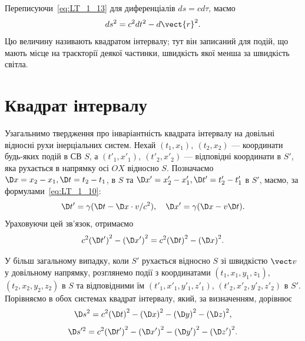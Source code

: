Переписуючи~\eqref{eq:LT_1_13} для диференціалів $ds=cd\tau $, маємо
\begin{equation*}
    ds^2=c^2dt^2-d\vect{r}^2.
\end{equation*}
Цю величину називають квадратом інтервалу; тут він записаний для подій, що мають місце на траєкторії деякої частинки,
швидкість якої менша за швидкість світла.

\section{Квадрат інтервалу}

Узагальнимо твердження про інваріантність квадрата інтервалу на довільні відносні рухи інерціальних систем. Нехай
$(t_1,x_1),\ (t_2,x_2)$ --- координати будь-яких подій в СВ $S$, а $(t'_1,x'_1),\ (t'_2,x'_2)$ --- відповідні координати
в $S'$, яка рухається в напрямку осі $OX$ відносно $S$. Позначаємо $\D x=x_2-x_1,\D t=t_2-t_1$, в $S$ та
$\D x'=x'_2-x'_1,\D t'=t'_2-t'_1$ в $S'$, маємо, за формулами~\eqref{eq:LT_1_10}:
\begin{equation*}
    \D t'=\gamma (\D t-\D x\cdot v/c^2),\quad \D x' = \gamma (\D x - v\D t).
\end{equation*}
Ураховуючи цей зв'язок, отримаємо
\begin{equation} \label{eq:LT_1_14}
	c^2{\left(\D t'\right)}^2-{\left(\D x'\right)}^2=c^2{\left(\D t\right)}^2-{\left(\D x\right)}^2.
\end{equation}

У більш загальному випадку, коли $S'$ рухається відносно $S$ зі швидкістю ${\vect v}$ у довільному напрямку, розглянемо
події з координатами $(t_1,x_1,y_1,z_1)$, $(t_2,x_2,y_2,z_2)$ в $S$ та відповідними їм $(t'_1,x'_1,y'_1,z'_1)$,
$(t'_2,x'_2,y'_2,z'_2)$ в $S'$. Порівняємо в обох системах квадрат інтервалу, який, за визначенням, дорівнює
\begin{equation*}
   	\D s^2=c^2{\left(\D t\right)}^2-{\left(\D x\right)}^2-{\left(\D y\right)}^2-{\left(\D z\right)}^2,
\end{equation*}
\begin{equation} \label{eq:LT_1_15}
	\D s'^2=c^2{\left(\D t'\right)}^2-{\left(\D x'\right)}^2-{\left(\D y'\right)}^2-{\left(\D z'\right)}^2.
\end{equation}

